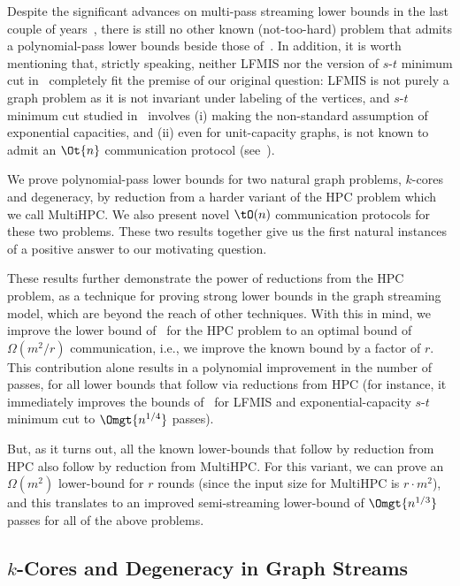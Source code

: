 Despite the significant advances on multi-pass streaming lower bounds in the last couple of years~\cite{ChakrabartiGMV20,AssadiKSY20,AssadiR20,ChenKPSSY21,AssadiN21,ChenKPSSY21b,Assadi22,AssadiKZ22,KolPSY23,ChenKPSSY23}, 
there is still no other known (not-too-hard) problem that admits a polynomial-pass lower bounds beside those of~\cite{AssadiCK19}. In addition, it is worth mentioning that, strictly speaking, neither LFMIS nor the version of $s$-$t$ minimum cut in~\cite{AssadiCK19} 
completely fit the premise of our original question: LFMIS is not purely a graph problem as it is not invariant under labeling of the vertices, and $s$-$t$ minimum cut  studied in~\cite{AssadiCK19} involves (i) making 
the non-standard assumption of exponential capacities, and (ii) even for unit-capacity graphs, is not known to admit an $\Ot{n}$ communication protocol (see~\cite{blikstadBEMN22}). 

\medskip
\noindent
We prove polynomial-pass lower bounds for two natural graph problems, $k$-cores and degeneracy, by reduction from a harder variant of the HPC problem which we call MultiHPC. We also present novel $\tO(n)$ communication protocols for these two problems. These two results together give us the first natural instances of a positive answer to our motivating question. 

These results further demonstrate the power of reductions from the HPC problem, as a technique for proving strong lower bounds in the graph streaming model, which are beyond the reach of other techniques. With this in mind, we improve the lower bound of~\cite{AssadiCK19} for the HPC problem to an optimal bound of $\Omega(m^2/r)$ communication, i.e., we improve the known bound by a factor of $r$. This contribution alone results in a polynomial improvement in the number of passes, for all lower bounds that follow via reductions from HPC (for instance, it immediately improves the bounds of~\cite{AssadiCK19} for LFMIS and exponential-capacity $s$-$t$ minimum cut to $\Omgt{n^{1/4}}$ passes).

But, as it turns out, all the known lower-bounds that follow by reduction from HPC also follow by reduction from MultiHPC. For this variant, we can prove an $\Omega(m^2)$ lower-bound for $r$ rounds (since the input size for MultiHPC is $r\cdot m^2$), and this translates to an improved semi-streaming lower-bound of $\Omgt{n^{1/3}}$ passes for all of the above problems.




\subsection{\texorpdfstring{$k$-Cores}{k-Cores} and Degeneracy in Graph Streams}\label{sec:degen-intro}

